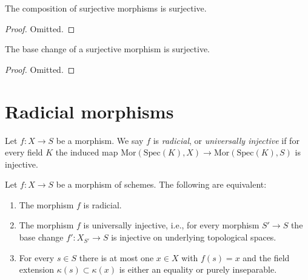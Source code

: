 \begin{lemma}
\label{lemma-composition-surjective}
The composition of surjective morphisms is surjective.
\end{lemma}

\begin{proof}
Omitted.
\end{proof}

\begin{lemma}
\label{lemma-base-change-surjective}
The base change of a surjective morphism is surjective.
\end{lemma}

\begin{proof}
Omitted.
\end{proof}




\section{Radicial morphisms}
\label{section-radicial}

\begin{definition}
\label{definition-radicial}
Let $f : X \to S$ be a morphism.
We say $f$ is {\it radicial}, or {\it universally injective}
if for every field $K$ the induced map
$\text{Mor}(\text{Spec}(K), X) \to \text{Mor}(\text{Spec}(K), S)$
is injective.
\end{definition}

\begin{lemma}
\label{lemma-radicial-universally-injective}
Let $f : X \to S$ be a morphism of schemes.
The following are equivalent:
\begin{enumerate}
\item The morphism $f$ is radicial.
\item The morphism $f$ is universally injective, i.e.,
for every morphism $S' \to S$ the base change $f' : X_{S'} \to S$
is injective on underlying topological spaces.
\item For every $s \in S$ there is at most one $x \in X$
with $f(s) = x$ and the field extension $\kappa(s) \subset \kappa(x)$
is either an equality or purely inseparable.
\end{enumerate}
\end{lemma}

